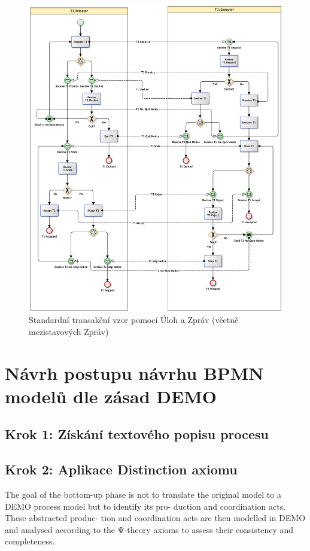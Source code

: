 \documentclass[]{article}
\begin{document}
\begin{figure}[H]\centering
\includegraphics[width=\textwidth,height=\textheight,keepaspectratio]{obrazky/transaction-standard-messages}
\caption{Standardní transakční vzor pomocí Úloh a Zpráv (včetně mezistavových Zpráv)}
\label{fig:St_trans_ulohy_zpravy_mezistav}
\end{figure}

\section{Návrh postupu návrhu BPMN modelů dle zásad DEMO}

\subsection{Krok 1: Získání textového popisu procesu}

\subsection{Krok 2: Aplikace Distinction axiomu}
The goal of the bottom-up phase is not to translate the original model to a DEMO process model but to identify its pro- duction and coordination acts. These abstracted produc- tion and coordination acts are then modelled in DEMO and analysed according to the Ψ-theory axioms to assess their consistency and completeness.
\end{document}

